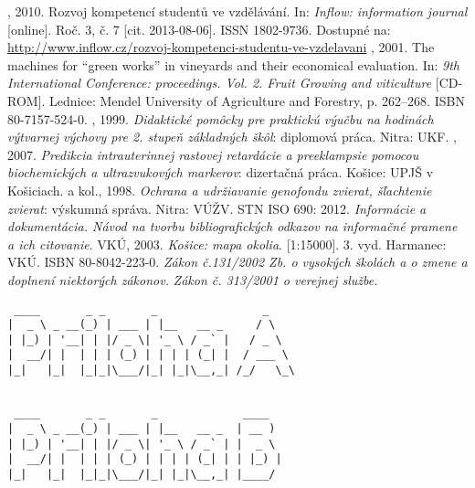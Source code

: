 \documentclass[thesismargins, thesislinespacing, twoside, openright, upjsfrontpage]{rnthesis}
\begin{document}
\begin{thebibliography}{9}
	, 2010. Rozvoj kompetencí studentů ve vzdělávání. In: \emph{Inflow: information journal} [online]. Roč. 3, č. 7 [cit. 2013-08-06]. ISSN 1802-9736. Dostupné na: \url{http://www.inflow.cz/rozvoj-kompetenci-studentu-ve-vzdelavani}
	, 2001. The machines for ``green works'' in vineyards and their economical evaluation. In: \emph{9th International Conference: proceedings. Vol. 2. Fruit Growing and viticulture} [CD-ROM]. Lednice: Mendel University of Agriculture and Forestry, p. 262--268. ISBN 80-7157-524-0.
	, 1999. \emph{Didaktické pomôcky pre praktickú výučbu na hodinách výtvarnej výchovy pre 2. stupeň základných škôl}: diplomová práca. Nitra: UKF.
	, 2007. \emph{Predikcia intrauterinnej rastovej retardácie a preeklampsie pomocou biochemických a ultrazvukových markerov}: dizertačná práca. Košice: UPJŠ v Košiciach.
	 a kol., 1998. \emph{Ochrana a udržiavanie genofondu zvierat, šľachtenie zvierat}: výskumná správa. Nitra: VÚŽV.
	STN ISO 690: 2012. \emph{Informácie a dokumentácia. Návod na tvorbu bibliografických odkazov na informačné pramene a ich citovanie}.
	VKÚ, 2003. \emph{Košice: mapa okolia}. [1:15000]. 3. vyd. Harmanec: VKÚ. ISBN 80-8042-223-0.
	\emph{Zákon č.131/2002 Zb. o vysokých školách a o zmene a doplnení niektorých zákonov.}
	\emph{Zákon č. 313/2001 o verejnej službe.}

\end{thebibliography}
%
%
\prilohy
{}
\begin{verbatim}
 ____       _ _       _                _    
|  _ \ _ __(_) | ___ | |__   __ _     / \   
| |_) | '__| | |/ _ \| '_ \ / _` |   / _ \  
|  __/| |  | | | (_) | | | | (_| |  / ___ \ 
|_|   |_|  |_|_|\___/|_| |_|\__,_| /_/   \_\
                                             
\end{verbatim}

\begin{verbatim}
 ____       _ _       _             ____  
|  _ \ _ __(_) | ___ | |__   __ _  | __ ) 
| |_) | '__| | |/ _ \| '_ \ / _` | |  _ \ 
|  __/| |  | | | (_) | | | | (_| | | |_) |
|_|   |_|  |_|_|\___/|_| |_|\__,_| |____/ 

\end{verbatim}
\end{document}
